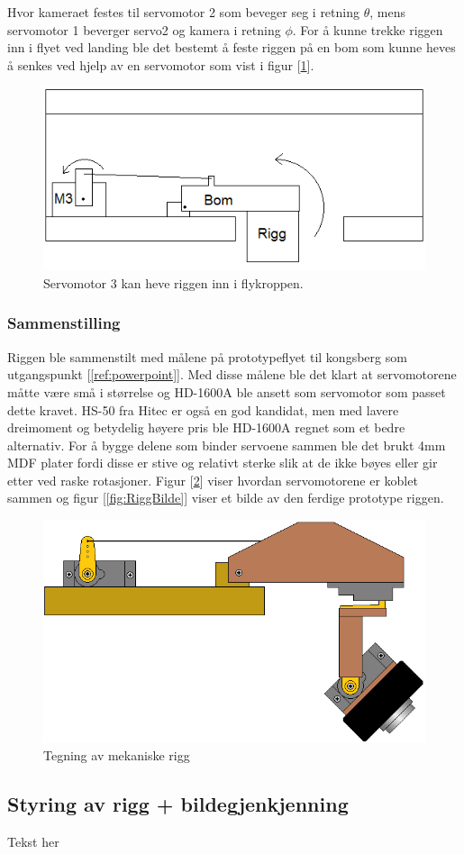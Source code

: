 Hvor kameraet festes til servomotor 2 som beveger seg i retning $\theta$, mens servomotor 1 beverger servo2 og kamera i retning $\phi$. For å kunne trekke riggen inn i flyet ved landing ble det bestemt å feste riggen på en bom som kunne heves å senkes ved hjelp av en servomotor som vist i figur [\ref{fig:bom}].

\begin{figure}[h!]
	\centering
	\includegraphics[scale=0.5]{img/Motor3.png}
	\caption{Servomotor 3 kan heve riggen inn i flykroppen.}
	\label{fig:bom}
\end{figure}


\subsubsection{Sammenstilling}
Riggen ble sammenstilt med målene på prototypeflyet til kongsberg som utgangspunkt [\ref{ref:powerpoint}]. Med disse målene ble det klart at servomotorene måtte være små i størrelse og HD-1600A ble ansett som servomotor som passet dette kravet. HS-50 fra Hitec er også en god kandidat, men med lavere dreimoment og betydelig høyere pris ble HD-1600A regnet som et bedre alternativ. For å bygge delene som binder servoene sammen ble det brukt 4mm MDF plater fordi disse er stive og relativt sterke slik at de ikke bøyes eller gir etter ved raske rotasjoner. Figur [\ref{fig:RiggTegn}] viser hvordan servomotorene er koblet sammen og figur [\ref{fig:RiggBilde}] viser et bilde av den ferdige prototype riggen. 

\begin{figure}[h!]
	\centering
	\includegraphics[scale=0.5]{img/RIGG_sattsammen.png}
	\caption{Tegning av mekaniske rigg}
	\label{fig:RiggTegn}
\end{figure}

 

\subsection{Styring av rigg + bildegjenkjenning}

Tekst her